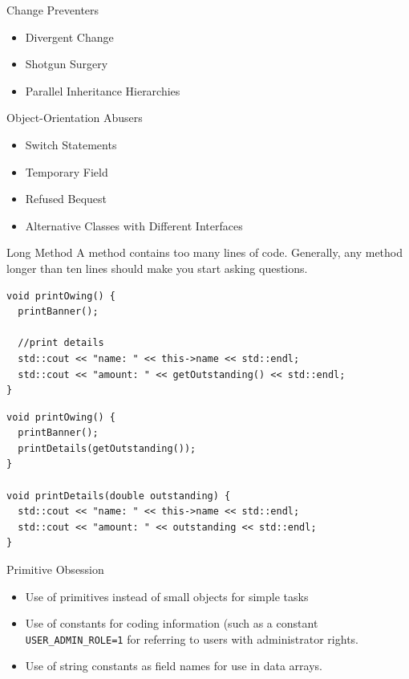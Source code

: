 \documentclass{beamer}
\begin{document}
\begin{frame}{Change Preventers}
\begin{itemize}
  \item Divergent Change
  \item Shotgun Surgery
  \item Parallel Inheritance Hierarchies
\end{itemize}
\end{frame}

\begin{frame}{Object-Orientation Abusers}
\begin{itemize}
  \item Switch Statements
  \item Temporary Field
  \item Refused Bequest
  \item Alternative Classes with Different Interfaces
\end{itemize}
\end{frame}

\begin{frame}[fragile]{Long Method}
A method contains too many lines of code. Generally, any method longer than ten
lines should make you start asking questions.

\begin{lstlisting}
void printOwing() {
  printBanner();

  //print details
  std::cout << "name: " << this->name << std::endl;
  std::cout << "amount: " << getOutstanding() << std::endl;
}
\end{lstlisting}

\begin{lstlisting}
void printOwing() {
  printBanner();
  printDetails(getOutstanding());
}

void printDetails(double outstanding) {
  std::cout << "name: " << this->name << std::endl;
  std::cout << "amount: " << outstanding << std::endl;
}
\end{lstlisting}
\end{frame}

\begin{frame}{Primitive Obsession}
\begin{itemize}
  \item Use of primitives instead of small objects for simple tasks
  \item Use of constants for coding information (such as a constant
  \lstinline{USER_ADMIN_ROLE=1} for referring to users with administrator
  rights.
  \item Use of string constants as field names for use in data arrays.
\end{itemize}
\end{frame}
\end{document}
